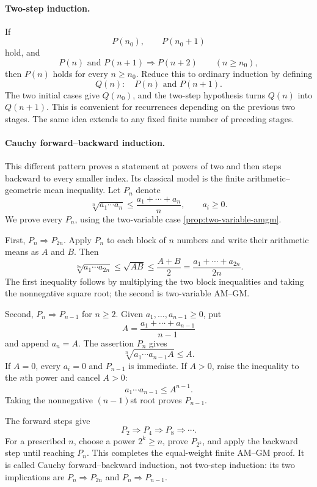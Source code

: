 \paragraph{Two-step induction.}
If
\[
P(n_0),\qquad P(n_0+1)
\]
hold, and
\[
P(n)\text{ and }P(n+1)\Longrightarrow P(n+2)
\qquad(n\geq n_0),
\]
then \(P(n)\) holds for every \(n\geq n_0\). Reduce this to ordinary
induction by defining
\[
Q(n):\quad P(n)\text{ and }P(n+1).
\]
The two initial cases give \(Q(n_0)\), and the two-step hypothesis turns
\(Q(n)\) into \(Q(n+1)\). This is convenient for recurrences depending on
the previous two stages. The same idea extends to any fixed finite number of
preceding stages.

\paragraph{Cauchy forward--backward induction.}
This different pattern proves a statement at powers of two and then steps
backward to every smaller index. Its classical model is the finite
arithmetic--geometric mean inequality. Let \(P_n\) denote
\[
\sqrt[n]{a_1\cdots a_n}\leq\frac{a_1+\cdots+a_n}{n},
\qquad a_i\geq0.
\]
We prove every \(P_n\), using the two-variable case
\cref{prop:two-variable-amgm}.

First, \(P_n\Rightarrow P_{2n}\). Apply \(P_n\) to each block of \(n\)
numbers and write their arithmetic means as \(A\) and \(B\). Then
\[
\sqrt[2n]{a_1\cdots a_{2n}}
\leq\sqrt{AB}\leq\frac{A+B}{2}
=\frac{a_1+\cdots+a_{2n}}{2n}.
\]
The first inequality follows by multiplying the two block inequalities and
taking the nonnegative square root; the second is two-variable AM--GM.

Second, \(P_n\Rightarrow P_{n-1}\) for \(n\geq2\). Given
\(a_1,\ldots,a_{n-1}\geq0\), put
\[
A=\frac{a_1+\cdots+a_{n-1}}{n-1}
\]
and append \(a_n=A\). The assertion \(P_n\) gives
\[
\sqrt[n]{a_1\cdots a_{n-1}A}\leq A.
\]
If \(A=0\), every \(a_i=0\) and \(P_{n-1}\) is immediate. If \(A>0\),
raise the inequality to the \(n\)th power and cancel \(A>0\):
\[
a_1\cdots a_{n-1}\leq A^{n-1}.
\]
Taking the nonnegative \((n-1)\)st root proves \(P_{n-1}\).

The forward steps give
\[
P_2\Longrightarrow P_4\Longrightarrow P_8\Longrightarrow\cdots.
\]
For a prescribed \(n\), choose a power \(2^k\geq n\), prove \(P_{2^k}\),
and apply the backward step until reaching \(P_n\). This completes the
equal-weight finite AM--GM proof. It is called Cauchy forward--backward
induction, not two-step induction: its two implications are
\(P_n\Rightarrow P_{2n}\) and \(P_n\Rightarrow P_{n-1}\).

